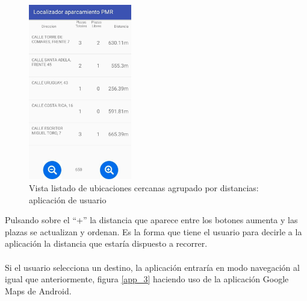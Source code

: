 \begin{figure}[H]
	\centering
	\includegraphics[width=0.4\textwidth]{imagenes/app/6.jpg}
	\caption{Vista listado de ubicaciones cercanas agrupado por distancias: aplicación de usuario}
	\label{app_6}
\end{figure}
Pulsando sobre el ``+'' la distancia que aparece entre los botones aumenta y las plazas se actualizan y ordenan. Es la  forma que tiene el usuario para decirle a la aplicación la distancia que estaría dispuesto a recorrer.
\\\\
Si el usuario selecciona un destino, la aplicación entraría en modo navegación al igual que anteriormente, figura \ref{app_3} haciendo uso de la aplicación Google Maps de Android.